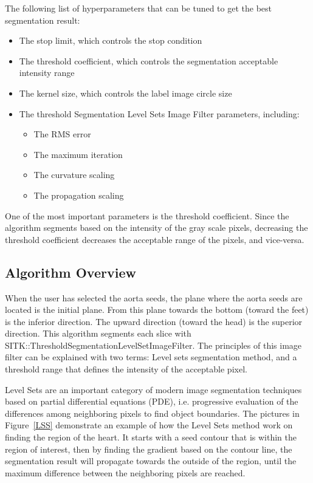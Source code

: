 The following list of hyperparameters that can be tuned to get the best segmentation result:
\begin{itemize}
\item The stop limit, which controls the stop condition
\item The threshold coefficient, which controls the segmentation acceptable intensity range
\item The kernel size, which controls the label image circle size 
\item The threshold Segmentation Level Sets Image Filter parameters, including:
\begin{itemize}
\item The RMS error
\item The maximum iteration
\item The curvature scaling
\item The propagation scaling
\end{itemize}
\end{itemize}

One of the most important parameters is the threshold coefficient. Since the algorithm segments based on the intensity of the gray scale pixels, decreasing the threshold coefficient decreases the acceptable range of the pixels, and vice-versa. 


\subsection{Algorithm Overview} \label{algo}

When the user has selected the aorta seeds, the plane where the aorta seeds are located is the initial plane. From this plane towards the bottom (toward the feet) is the inferior direction. The upward direction (toward the head) is the superior direction. This algorithm segments each slice with SITK::ThresholdSegmentationLevelSetImageFilter. The principles of this image filter can be explained with two terms: Level sets segmentation method, and a threshold range that defines the intensity of the acceptable pixel.

Level Sets are an important category of modern image segmentation techniques based on partial differential equations (PDE), i.e. progressive evaluation of the differences among neighboring pixels to find object boundaries. The pictures in Figure~\ref{LSS} demonstrate an example of how the Level Sets method work on finding the region of the heart. It starts with a seed contour that is within the region of interest, then by finding the gradient based on the contour line, the segmentation result will propagate towards the outside of the region, until the maximum difference between the neighboring pixels are reached.


